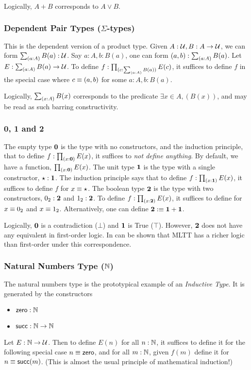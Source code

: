 Logically, $A + B$ corresponds to $ A \lor B$.

\subsubsection{Dependent Pair Types ($\Sigma$-types)}
This is the dependent version of a product type. Given $A : \mathcal{U}, B : A \to \mathcal{U}$, we can form $\sum_{(a:A)}{B(a)} : \mathcal{U}$.
Say $a : A, b : B(a)$, one can form $(a,b) : \sum_{(a:A)}{B(a)}$. 
Let $E : \sum_{(a:A)}{B(a)} \to \mathcal{U}$. To define $f : \prod_{(c:\sum_{(a:A)}{B(a)})}{E(c)}$, it suffices to define
$f$ in the special case where $c \equiv (a,b)$ for some $a : A, b : B(a)$.

Logically, $\sum_{(x:A)}{B(x)}$ corresponds to the predicate $\exists x \in A, (B(x))$, and may be read as such barring constructivity.

\subsubsection{0, 1 and 2}
The empty type $\mathbf{0}$ is the type with no constructors, and the induction principle, that to define
$f : \prod_{(x:\mathbf{0})}{E(x)}$, it suffices to \textit{not define anything}. By default, we have a function,
$\prod_{(x:\mathbf{0})}{E(x)}$.
The unit type $\mathbf{1}$ is the type with a single constructor, $\star : \mathbf{1}$. The induction principle says that
to define $f : \prod_{(x:\mathbf{1})}{E(x)}$, it suffices to define $f$ for $x \equiv \star$.
The boolean type $\mathbf{2}$ is the type with two constructors, $0_2 : \mathbf{2}$ and $1_2 : \mathbf{2}$. To define 
$f : \prod_{(x:\mathbf{2})}{E(x)}$, it suffices to define for $x \equiv 0_2$ and $x \equiv 1_2$.
Alternatively, one can define $\mathbf{2} :\equiv \mathbf{1} + \mathbf{1}$.

Logically, $\mathbf{0}$ is a contradiction ($\bot$) and $\mathbf{1}$ is True ($\top$).
However, $\mathbf{2}$ does not have any equivalent in first-order logic. In can be shown that MLTT has a richer logic than first-order under this
correspondence.

\subsubsection{Natural Numbers Type ($\mathbb{N}$)}
The natural numbers type is the prototypical example of an \textit{Inductive Type}. It is generated by the constructors
\begin{itemize}
  \item $\mathsf{zero} : \mathbb{N}$
  \item $\mathsf{succ} : \mathbb{N} \to \mathbb{N}$
\end{itemize}
Let $E : \mathbb{N} \to \mathcal{U}$. Then to define $E(n)$ for all $n: \mathbb{N}$, it suffices to define it for the following special case 
$n \equiv \mathsf{zero}$, and for all $m : \mathbb{N}$, given $f(m)$ define it for $n \equiv \mathsf{succ}(m)$.
(This is almost the usual principle of mathematical induction!)

